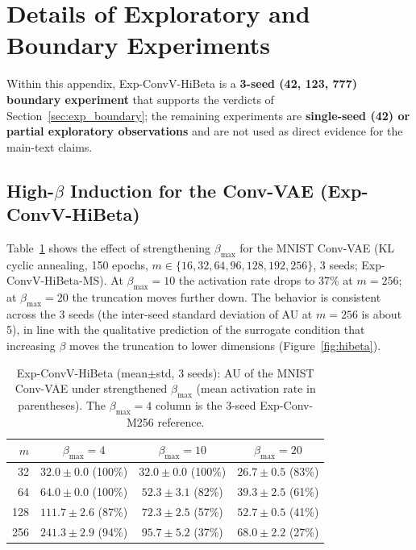 \documentclass[make,article,submit,pdftex,moreauthors]{Definitions/mdpi}
\begin{document}
\section[\appendixname~\thesection]{Details of Exploratory and Boundary Experiments}\label{app:exploratory}

Within this appendix, Exp-ConvV-HiBeta is a \textbf{3-seed (42, 123, 777)
boundary experiment} that supports the verdicts of
Section~\ref{sec:exp_boundary}; the remaining experiments are
\textbf{single-seed (42) or partial exploratory observations} and are not
used as direct evidence for the main-text claims.

\subsection[\appendixname~\thesubsection]{High-$\beta$ Induction for the Conv-VAE (Exp-ConvV-HiBeta)}

Table~\ref{tab:hibeta} shows the effect of strengthening $\beta_{\max}$ for
the MNIST Conv-VAE (KL cyclic annealing, 150 epochs,
$m \in \{16, 32, 64, 96, 128, 192, 256\}$, 3 seeds; Exp-ConvV-HiBeta-MS).
At $\beta_{\max} = 10$ the activation rate drops to 37\% at $m = 256$; at
$\beta_{\max} = 20$ the truncation moves further down.
The behavior is consistent across the 3 seeds (the inter-seed standard
deviation of AU at $m = 256$ is about 5), in line with the qualitative
prediction of the surrogate condition that increasing $\beta$ moves the
truncation to lower dimensions (Figure~\ref{fig:hibeta}).

\begin{table}[H]
\caption{Exp-ConvV-HiBeta (mean$\pm$std, 3 seeds): AU of the MNIST
Conv-VAE under strengthened $\beta_{\max}$ (mean activation rate in
parentheses). The $\beta_{\max} = 4$ column is the 3-seed Exp-Conv-M256
reference.}
\label{tab:hibeta}
\small
\begin{tabular}{rccc}
\toprule
$m$ & $\beta_{\max} = 4$ & $\beta_{\max} = 10$ & $\beta_{\max} = 20$ \\
\midrule
 32 & $32.0 \pm 0.0$ (100\%) & $32.0 \pm 0.0$ (100\%) & $26.7 \pm 0.5$ (83\%) \\
 64 & $64.0 \pm 0.0$ (100\%) & $52.3 \pm 3.1$ (82\%) & $39.3 \pm 2.5$ (61\%) \\
128 & $111.7 \pm 2.6$ (87\%) & $72.3 \pm 2.5$ (57\%) & $52.7 \pm 0.5$ (41\%) \\
256 & $241.3 \pm 2.9$ (94\%) & $95.7 \pm 5.2$ (37\%) & $68.0 \pm 2.2$ (27\%) \\
\bottomrule
\end{tabular}
\end{table}
\end{document}

